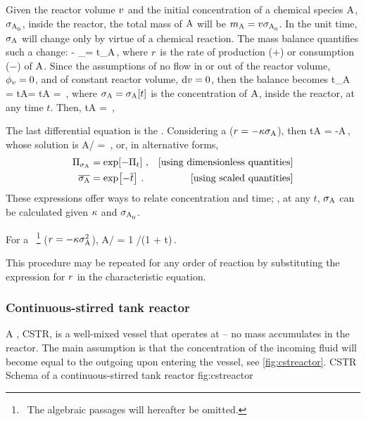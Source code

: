 Given the reactor volume $v$ and the initial concentration of a chemical species $\ce A$, $\conc{A,0}$, inside the reactor, the total mass of $\ce A$ will be $\mass_{\ce A} = \vol\conc{A,0}$. In the unit time, $\conc A$ will change only by virtue of a chemical reaction. The mass balance quantifies such a change:
\beq
\flow\vol{} - \flow\vol{} \pm \int_\vol\rrate\dx\vol = \iod t\mass_{\ce A}\,,
\eeq
where $r$ is the rate of production ($+$) or consumption ($-$) of $\ce A$. Since the assumptions of no flow in or out of the reactor volume, $\phi_{v} = 0$, and of constant reactor volume, $\text{d}v = 0$, then the balance becomes
\beq
\iod t\mass_{\ce A} = \iod t\conc A\vol = \vol\iod t\conc A = \vol\rrate\,,
\eeq
where $\conc A = \conc A\vat t$ is the concentration of $\ce A$, inside the reactor, at any time $t$. Then,
\beq
\iod t\conc A = \rrate\,,
\eeq

The last differential equation is the . Considering a  ($\rrate = -\krcoeff\conc A$), then
\beq
\iod t\conc A = -\krcoeff\conc A\,,
\eeq
whose solution is
\beq
\conc A/ = \exp{}\,,
\eeq
or, in alternative forms,
\begin{align*}
\kdim_{\conc A} &= \exp\vat{-\kdim_t}\,, & \text{[using dimensionless quantities]} \\
 \scpq{\conc A} &= \exp\vat{-\scpq t}\,. & \text{[using scaled quantities]}
\end{align*}
These expressions offer ways to relate concentration and time; \ie, at any $t$, $\conc A$ can be calculated given $\kappa$ and $\conc{A,0}$.

For a ~\footnote{~The algebraic passages will hereafter be omitted.} ($\rrate = -\krcoeff\conc A^2$),
\beq
\conc A/ = 1 /\left(1 + \krcoeff{}t\right)\,.
\eeq

This procedure may be repeated for any order of reaction by substituting the expression for $r$ in the
characteristic equation. 


\subsubsection{Continuous-stirred tank reactor}
A , CSTR, is a well-mixed vessel that operates at  -- no mass accumulates in the reactor. The main assumption is that the concentration of the incoming fluid will become  equal to the outgoing upon entering the vessel, see \cref{fig:cstreactor}.
%
   {CSTR}
   {Schema of a continuous-stirred tank reactor}%
   {fig:cstreactor}%


